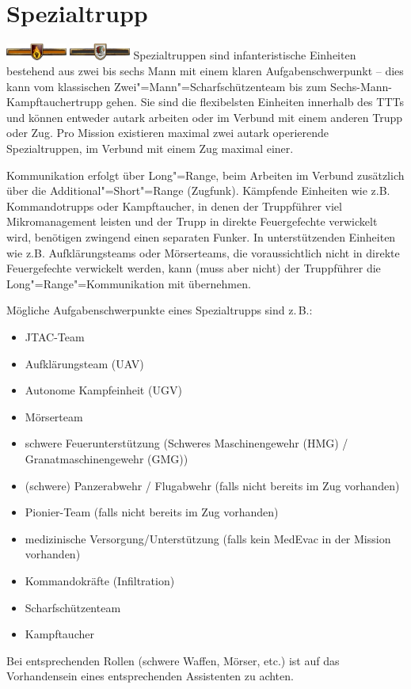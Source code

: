 \section{Spezialtrupp}
\includegraphics[width=20mm]{../img/truppenordnung/spezialeinheiten/sf1}\quad
\includegraphics[width=20mm]{../img/truppenordnung/spezialeinheiten/sf2}\linebreak
Spezialtruppen sind infanteristische Einheiten bestehend aus zwei bis sechs Mann mit einem klaren Aufgabenschwerpunkt -- dies kann vom klassischen Zwei"=Mann"=Scharfschützenteam bis zum Sechs-Mann-Kampftauchertrupp gehen. Sie sind die flexibelsten Einheiten innerhalb des TTTs und können entweder autark arbeiten oder im Verbund mit einem anderen Trupp oder Zug. Pro Mission existieren maximal zwei autark operierende Spezialtruppen, im Verbund mit einem Zug maximal einer.\par
Kommunikation erfolgt über Long"=Range, beim Arbeiten im Verbund zusätzlich über die Additional"=Short"=Range (Zugfunk). Kämpfende Einheiten wie z.B. Kommandotrupps oder Kampftaucher, in denen der Truppführer viel Mikromanagement leisten und der Trupp in direkte Feuergefechte verwickelt wird, benötigen zwingend einen separaten Funker. In unterstützenden Einheiten wie z.B. Aufklärungsteams oder Mörserteams, die voraussichtlich nicht in direkte Feuergefechte verwickelt werden, kann (muss aber nicht) der Truppführer die Long"=Range"=Kommunikation mit übernehmen.\par
Mögliche Aufgabenschwerpunkte eines Spezialtrupps sind z.\,B.:
\begin{itemize}
	\setlength\itemsep{0em}
	\item JTAC-Team
	\item Aufklärungsteam (UAV)
	\item Autonome Kampfeinheit (UGV)
	\item Mörserteam
	\item schwere Feuerunterstützung (Schweres Maschinengewehr (HMG) / Granatmaschinengewehr (GMG))
	\item (schwere) Panzerabwehr / Flugabwehr (falls nicht bereits im Zug vorhanden)
	\item Pionier-Team (falls nicht bereits im Zug vorhanden)
	\item medizinische Versorgung/Unterstützung (falls kein MedEvac in der Mission vorhanden)
	\item Kommandokräfte (Infiltration)
	\item Scharfschützenteam
	\item Kampftaucher
\end{itemize}
Bei entsprechenden Rollen (schwere Waffen, Mörser, etc.) ist auf das Vorhandensein eines entsprechenden Assistenten zu achten.